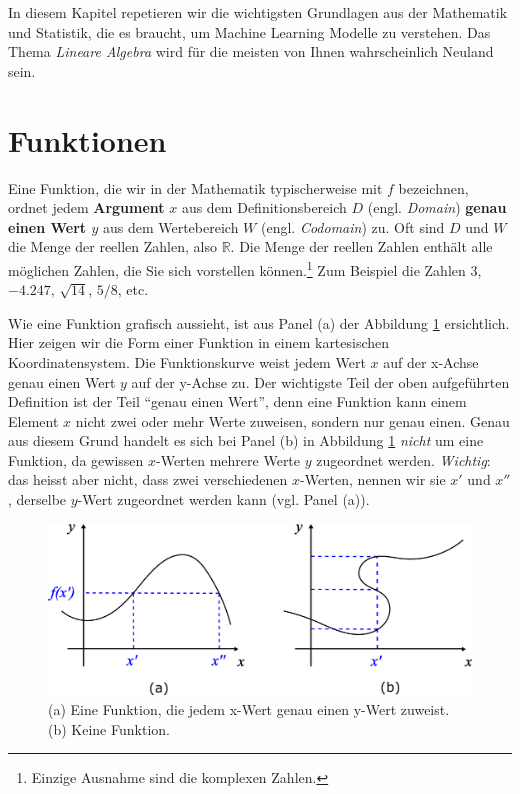 \documentclass[
]{book}
\begin{document}
In diesem Kapitel repetieren wir die wichtigsten Grundlagen aus der Mathematik und Statistik, die es braucht, um Machine Learning Modelle zu verstehen. Das Thema \emph{Lineare Algebra} wird für die meisten von Ihnen wahrscheinlich Neuland sein.

\hypertarget{funktionen}{%
\section{Funktionen}\label{funktionen}}

Eine Funktion, die wir in der Mathematik typischerweise mit \(f\) bezeichnen, ordnet jedem \textbf{Argument} \(x\) aus dem Definitionsbereich \(D\) (engl. \emph{Domain}) \textbf{genau einen Wert \(y\)} aus dem Wertebereich \(W\) (engl. \emph{Codomain}) zu. Oft sind \(D\) und \(W\) die Menge der reellen Zahlen, also \(\mathbb{R}\). Die Menge der reellen Zahlen enthält alle möglichen Zahlen, die Sie sich vorstellen können.\footnote{Einzige Ausnahme sind die komplexen Zahlen.} Zum Beispiel die Zahlen \(3\), \(-4.247\), \(\sqrt{14}\), \(5/8\), etc.

Wie eine Funktion grafisch aussieht, ist aus Panel (a) der Abbildung \ref{fig:functions} ersichtlich. Hier zeigen wir die Form einer Funktion in einem kartesischen Koordinatensystem. Die Funktionskurve weist jedem Wert \(x\) auf der x-Achse genau einen Wert \(y\) auf der y-Achse zu. Der wichtigste Teil der oben aufgeführten Definition ist der Teil ``genau einen Wert'', denn eine Funktion kann einem Element \(x\) nicht zwei oder mehr Werte zuweisen, sondern nur genau einen. Genau aus diesem Grund handelt es sich bei Panel (b) in Abbildung \ref{fig:functions} \emph{nicht} um eine Funktion, da gewissen \(x\)-Werten mehrere Werte \(y\) zugeordnet werden. \emph{Wichtig}: das heisst aber nicht, dass zwei verschiedenen \(x\)-Werten, nennen wir sie \(x'\) und \(x''\), derselbe \(y\)-Wert zugeordnet werden kann (vgl. Panel (a)).

\begin{figure}

{\centering \includegraphics[width=0.8\linewidth]{images/Functions} 

}

\caption{(a) Eine Funktion, die jedem x-Wert genau einen y-Wert zuweist. (b) Keine Funktion. }\label{fig:functions}
\end{figure}
\end{document}
